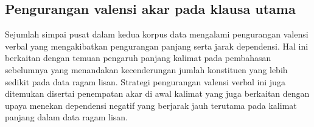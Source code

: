 \subsection{Pengurangan valensi akar pada klausa utama}
Sejumlah simpai pusat dalam kedua korpus data mengalami pengurangan valensi verbal yang mengakibatkan pengurangan panjang serta jarak dependensi. Hal ini berkaitan dengan temuan pengaruh panjang kalimat pada pembahasan sebelumnya yang menandakan kecenderungan jumlah konstituen yang lebih sedikit pada data ragam lisan. Strategi pengurangan valensi verbal ini juga ditemukan disertai penempatan akar di awal kalimat yang juga berkaitan dengan upaya menekan dependensi negatif yang berjarak jauh terutama pada kalimat panjang dalam data ragam lisan.

